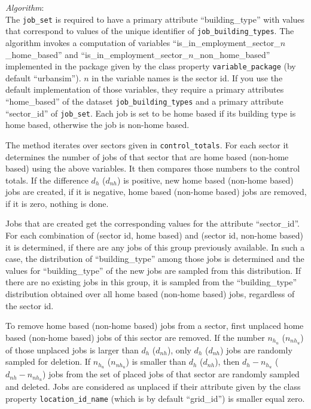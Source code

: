 {\it Algorithm}:~\\[1mm]
The \verb|job_set| is required to have a primary attribute \primaryattributesindex
``building_type'' with values that correspond to values of the unique identifier of \verb|job_building_types|.
The algorithm invokes a computation of variables
``is_in_employment_sector_$n$_home_based'' and
``is_in_employment_sector_$n$_non_home_based'' implemented in the package
given by the class property \verb|variable_package| (by default
``urbansim''). $n$ in the variable names is the sector id. If you use
the default  implementation of those variables, they require
a primary attributes \primaryattributesindex ``home_based'' of the dataset \verb|job_building_types|
and a primary attribute ``sector_id'' of \verb|job_set|. Each job is set to be home based if its building 
type is home based, otherwise the job is non-home based.  

The method iterates over sectors given in \verb|control_totals|. For each
sector it determines the number of jobs of that sector that are home based
(non-home based) using the above variables. It then compares those numbers to
the control totals.  If the difference $d_h$ ($d_{nh}$) is positive, new home
based (non-home based) jobs are created, if it is negative, home based
(non-home based) jobs are removed, if it is zero, nothing is done.

Jobs that are created get the corresponding values for the attribute
``sector_id''. For each combination of (sector id, home based) and (sector id, non-home based) 
it is determined, if there are any jobs of this group
previously available. In such a case, the distribution of ``building_type'' among those jobs is
determined and the values for ``building_type'' of the new jobs are sampled
from this distribution. If there are no existing jobs in this group, it is
sampled from the ``building_type'' distribution obtained over all home based
(non-home based) jobs, regardless of the sector id.

To remove home based (non-home based) jobs from a sector, first unplaced home
based (non-home based) jobs of this sector are removed. If the number $n_{h_u}$
($n_{nh_u}$) of those unplaced jobs is larger than $d_h$ ($d_{nh}$), only
$d_h$ ($d_{nh}$) jobs are randomly sampled for deletion. If $n_{h_u}$
($n_{nh_u}$) is smaller than $d_h$ ($d_{nh}$), then $d_h-n_{h_u}$
($d_{nh}-n_{nh_u}$) jobs from the set of placed jobs of that sector are
randomly sampled and deleted. Jobs are considered as unplaced if their
attribute given by the class property \verb|location_id_name| (which is by
default ``grid_id'') is smaller equal zero.

